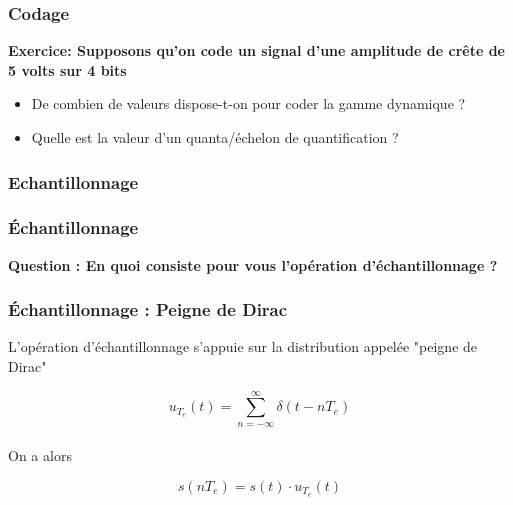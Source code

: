 \documentclass{beamer}
\begin{document}
\begin{frame}
\frametitle{Codage} 
\textbf{Exercice: Supposons qu'on code un signal d'une amplitude de crête de 5 volts sur 4 bits}\\
\vspace{1cm}
\begin{itemize}
\item<2-> De combien de valeurs dispose-t-on pour coder la gamme dynamique ?  
\item<3-> Quelle est la valeur d'un quanta/échelon de quantification ?  
\end{itemize}

\end{frame} 

\subsubsection{Echantillonnage} 
\begin{frame} 
\frametitle{\'Echantillonnage} 

\textbf{Question : En quoi consiste pour vous l'opération d'échantillonnage ?}

\end{frame}

\begin{frame}
\frametitle{\'Echantillonnage : Peigne de Dirac}

L'opération d'échantillonnage s'appuie sur la distribution appelée "peigne de Dirac"\\

\vspace{0.7cm} 

 \[ u_{T_e}(t) = \sum_{n = -\infty}^{\infty} \delta(t-nT_e) \]\\
 
\vspace{0.7cm}
On a alors\\

\vspace{0.3cm}
\begin{block}{}
 \[s(nT_e) = s(t) \cdot u_{T_e}(t) \]
\end{block}

\end{frame} 
\end{document}
